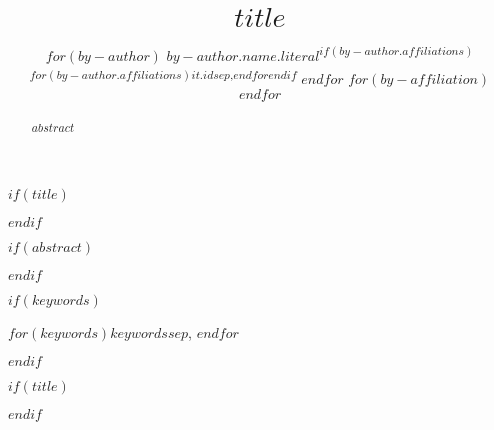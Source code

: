 
$if(title)$
\title{$title$}
$endif$

\author{
$for(by-author)$
$by-author.name.literal$\textsuperscript{$if(by-author.affiliations)$$for(by-author.affiliations)$$it.id$$sep$,$endfor$$endif$}
$endfor$
$for(by-affiliation)$
$endfor$
}


$if(abstract)$
\begin{abstract}
$abstract$
\end{abstract}
$endif$

$if(keywords)$
\begin{keywords}
$for(keywords)$$keywords$$sep$, $endfor$
\end{keywords}
$endif$

$if(title)$
\maketitle
$endif$